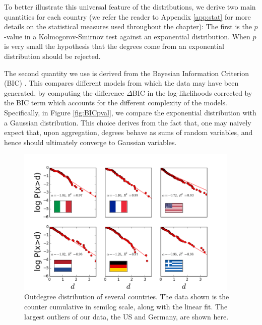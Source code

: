 To better illustrate this universal feature of the distributions, we
derive two main quantities for each country (we refer the reader to
Appendix \ref{app:stat} for more details on the statistical measures used throughout the chapter): The first is the $p$-value in a Kolmogorov-Smirnov 
test against an exponential distribution.%
When $p$ is very small the hypothesis that the degrees come from an
exponential distribution should be rejected. 

The second quantity we use is derived from the Bayesian Information Criterion (BIC)
\cite{Kass95}. This compares different models from which the data may have been generated,
by computing the difference $\Delta$BIC in the log-likelihoods corrected by the BIC term which accounts for
the different complexity of the models. 
Specifically, in Figure \ref{fig:BICpval}, we compare the exponential distribution with a Gaussian distribution. 
This choice derives from the fact that, one may naively expect that, upon aggregation, degrees 
behave as sums of random variables, and hence should ultimately converge to Gaussian variables. 


\begin{figure}[!ht]
  \centering
  \includegraphics[width=0.95\textwidth]{figs_io/6panel_data.png}
  \caption{Outdegree distribution of several countries. The data shown
    is the counter cumulative in semilog scale, along with the linear
    fit. The largest outliers of our data, the US and Germany, are
    shown here.}
  \label{fig:6countries}
\end{figure}

